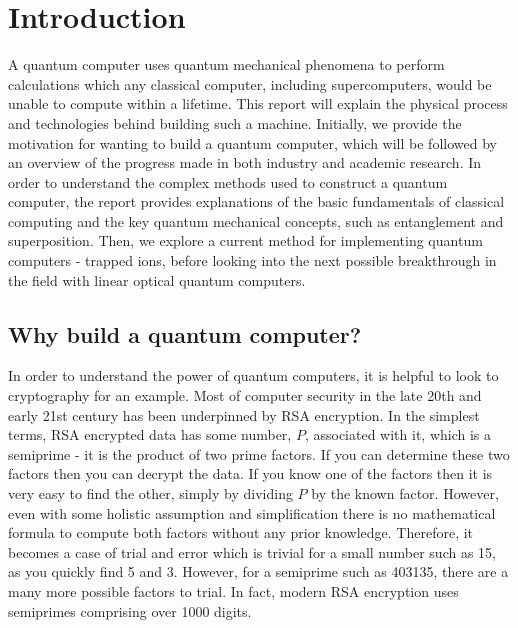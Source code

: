 \section{Introduction}
A quantum computer uses quantum mechanical phenomena to perform calculations which any classical computer, including supercomputers, would be unable to compute within a lifetime. \cite{noauthor_what_nodate}
This report will explain the physical process and technologies behind building such a machine. Initially, we provide the motivation for wanting to build a quantum computer, which will be followed by an overview of the progress made in both industry and academic research. In order to understand the complex methods used to construct a quantum computer, the report provides explanations of the basic fundamentals of classical computing and the key quantum mechanical concepts, such as entanglement and superposition. Then, we explore a current method for implementing quantum computers - trapped ions, before looking into the next possible breakthrough in the field with linear optical quantum computers.

\subsection{Why build a quantum computer?}\label{sec:why}
In order to understand the power of quantum computers, it is helpful to look to cryptography for an example. Most of computer security in the late 20th and early 21st century has been underpinned by RSA encryption. In the simplest terms, RSA encrypted data has some number, $P$, associated with it, which is a semiprime - it is the product of two prime factors. If you can determine these two factors then you can decrypt the data. If you know one of the factors then it is very easy to find the other, simply by dividing $P$ by the known factor. However, even with some holistic assumption and simplification there is no mathematical formula to compute both factors without any prior knowledge. Therefore, it becomes a case of trial and error which is trivial for a small number such as 15, as you quickly find 5 and 3. However, for a semiprime such as 403135, there are a many more possible factors to trial. In fact, modern RSA encryption uses semiprimes comprising over 1000 digits.

